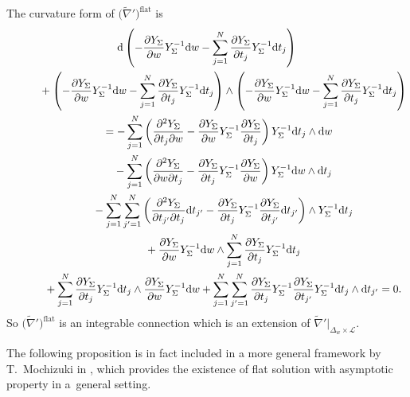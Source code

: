 \documentclass[pdftex]{sigma}
\numberwithin{equation}{section}
\begin{document}
The curvature form
of $\big(\tilde{\nabla}'\big)^{\mathrm{flat}}$ is
\begin{gather*}
 {\rm d} \left({-}\frac{\partial Y_{\Sigma}} {\partial w} Y_{\Sigma}^{-1} {\rm d}w
 -\sum_{j=1}^N \frac{\partial Y_{\Sigma}} {\partial t_j} Y_{\Sigma}^{-1} {\rm d}t_j \right)
 \\
\qquad\quad{} +
\left({-}\frac{\partial Y_{\Sigma}} {\partial w} Y_{\Sigma}^{-1} {\rm d}w
 -\sum_{j=1}^N \frac{\partial Y_{\Sigma}} {\partial t_j} Y_{\Sigma}^{-1} {\rm d}t_j \right)
 \wedge
\left( {-}\frac{\partial Y_{\Sigma}} {\partial w} Y_{\Sigma}^{-1} {\rm d}w
 -\sum_{j=1}^N \frac{\partial Y_{\Sigma}} {\partial t_j} Y_{\Sigma}^{-1} {\rm d}t_j \right)
 \\
\qquad{}=
 -\sum_{j=1}^N \left( \frac{\partial^2 Y_{\Sigma}} {\partial t_j\partial w}
 -\frac{\partial Y_{\Sigma}} {\partial w} Y_{\Sigma}^{-1}
 \frac{\partial Y_{\Sigma}} {\partial t_j} \right) Y_{\Sigma}^{-1} {\rm d}t_j \wedge {\rm d}w\\
 \qquad\quad{}
 -\sum_{j=1}^N \left( \frac{\partial^2 Y_{\Sigma}} {\partial w\partial t_j}
 -\frac{\partial Y_{\Sigma}}{\partial t_j}Y_{\Sigma}^{-1}\frac{\partial Y_{\Sigma}}{\partial w}
 \right) Y_{\Sigma}^{-1} {\rm d}w \wedge {\rm d}t_j
 \\
\qquad\quad{}
 -\sum_{j=1}^N
 \sum_{j'=1}^N \left( \frac{\partial^2Y_{\Sigma}}{\partial t_{j'}\partial t_j}{\rm d}t_{j'}
 -\frac{\partial Y_{\Sigma}} {\partial t_j}Y_{\Sigma}^{-1}
 \frac{\partial Y_{\Sigma}}{\partial t_{j'}} {\rm d}t_{j'}
 \right) \wedge Y_{\Sigma}^{-1} {\rm d}t_j\\
 \qquad\quad{}
 +\frac{\partial Y_{\Sigma}} {\partial w} Y_{\Sigma}^{-1} {\rm d}w \wedge
 \sum_{j=1}^N \frac{\partial Y_{\Sigma}} {\partial t_j} Y_{\Sigma}^{-1} {\rm d}t_j
 \\
\qquad\quad{}
 +\sum_{j=1}^N\frac{\partial Y_{\Sigma}} {\partial t_j} Y_{\Sigma}^{-1} {\rm d}t_j\wedge
 \frac{\partial Y_{\Sigma}} {\partial w} Y_{\Sigma}^{-1} {\rm d}w
 +\sum_{j=1}^N\sum_{j'=1}^N \frac{\partial Y_{\Sigma}}{\partial t_j}Y_{\Sigma}^{-1}
 \frac{\partial Y_{\Sigma}}{\partial t_{j'}} Y_{\Sigma}^{-1} {\rm d}t_j\wedge {\rm d}t_{j'}
=0.
\end{gather*}
So $\big(\tilde{\nabla}'\big)^{\mathrm{flat}}$
is an integrable connection which is an extension of
$\tilde{\nabla}'|_{\Delta_w\times{\mathcal L}}$.

The following proposition
is in fact included in a more general framework by T.~Mochizuki in \cite[Section~20.3]{Mochizuki},
which provides the existence of flat solution with asymptotic property
in a~general setting.
\end{document}
